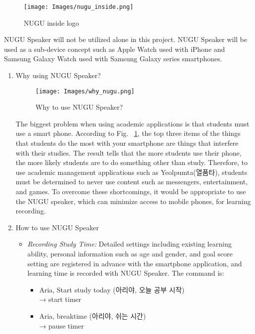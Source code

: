\documentclass[conference]{IEEEtran}
\begin{document}
\begin{figure}[htp]
    \centering
    \texttt{[image: Images/nugu\_inside.png]}
    \caption{NUGU inside logo}
\end{figure}

NUGU Speaker will not be utilized alone in this project. NUGU Speaker will be used as a sub-device concept such as Apple Watch used with iPhone and Samsung Galaxy Watch used with Samsung Galaxy series smartphones.

\begin{enumerate}
\item Why using NUGU Speaker?
\begin{figure}[H]
    \centering
    \texttt{[image: Images/why\_nugu.png]}
    \caption{Why to use NUGU Speaker?}
    \label{figure:useNuguSpeaker}
\end{figure}

The biggest problem when using academic applications is that students must use a smart phone. According to Fig. ~\ref{figure:useNuguSpeaker}, the top three items of the things that students do the most with your smartphone are things that interfere with their studies. The result tells that the more students use their phone, the more likely students are to do something other than study. Therefore, to use academic management applications such as Yeolpumta(열품타), students must be determined to never use content such as messengers, entertainment, and games. To overcome these shortcomings, it would be appropriate to use the NUGU speaker, which can minimize access to mobile phones, for learning recording.\\


\item How to use NUGU Speaker

\begin{itemize}
\item \textit{Recording Study Time:} Detailed settings including existing learning ability, personal information such as age and gender, and goal score setting are registered in advance with the smartphone application, and learning time is recorded with NUGU Speaker. The command is:

\begin{itemize}
\item Aria, Start study today
(아리야, 오늘 공부 시작) \\
 → start timer

\item Aria, breaktime
(아리야, 쉬는 시간) \\
→ pause timer


\end{itemize}
\end{itemize}
\end{enumerate}
\end{document}

